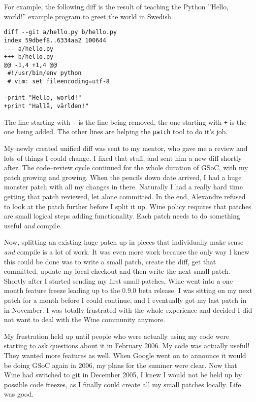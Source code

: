 For example, the following diff is the result of teaching the Python ''Hello,
world!'' example program to greet the world in Swedish.

\begin{verbatim}
diff --git a/hello.py b/hello.py
index 59dbef8..6334aa2 100644
--- a/hello.py
+++ b/hello.py
@@ -1,4 +1,4 @@
 #!/usr/bin/env python
 # vim: set fileencoding=utf-8

-print "Hello, world!"
+print "Hallå, världen!"
\end{verbatim}

The line starting with \texttt{-} is the line being removed, the one starting
with \texttt{+} is the one being added. The other lines are helping the
\texttt{patch} tool to do it's job.

My newly created unified diff was sent to my mentor, who gave me a review and
lots of things I could change. I fixed that stuff, and sent him a new diff
shortly after. The code--review cycle continued for the whole duration of GSoC,
with my patch growing and growing. When the pencils down date arrived, I had
a huge monster patch with all my changes in there. Naturally I had a really hard
time getting that patch reviewed, let alone committed. In the end, Alexandre
refused to look at the patch further before I split it up. Wine policy requires
that patches are small logical steps adding functionality. Each patch needs to
do something useful \emph{and} compile.

Now, splitting an existing huge patch up in pieces that individually make sense
\emph{and} compile is a lot of work. It was even more work because the only way
I knew this could be done was to write a small patch, create the diff, get that
committed, update my local checkout and then write the next small patch. Shortly
after I started sending my first small patches, Wine went into a one month
feature freeze leading up to the 0.9.0 beta release. I was sitting on my next
patch for a month before I could continue, and I eventually got my last patch in
in November. I was totally frustrated with the whole experience and decided I
did not want to deal with the Wine community anymore.

My frustration held up until people who were actually using my code were
starting to ask questions about it in February 2006. My code was actually
useful! They wanted more features as well. When Google went on to announce it
would be doing GSoC again in 2006, my plans for the summer were clear. Now that
Wine had switched to git in December 2005, I knew I would not be held up by
possible code freezes, as I finally could create all my small patches locally.
Life was good.


